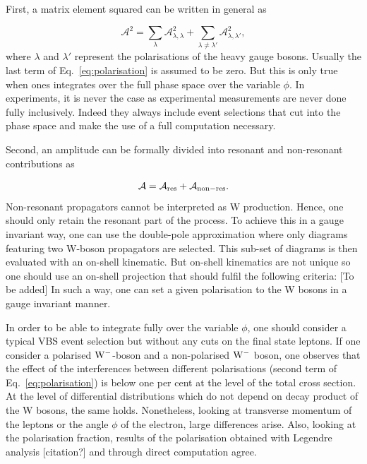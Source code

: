 First, a matrix element squared can be written in general as

\begin{equation}
\label{eq:polarisation}
 \mathcal{A}^2 = \sum_{\lambda} \mathcal{A}^2_{\lambda, \lambda} + \sum_{\lambda \neq \lambda'} \mathcal{A}^2_{\lambda, \lambda'}, 
\end{equation}
%
where $\lambda$ and $\lambda'$ represent the polarisations of the heavy gauge bosons.
Usually the last term of Eq.~\eqref{eq:polarisation} is assumed to be zero.
But this is only true when ones integrates over the full phase space over the variable $\phi$.
In experiments, it is never the case as experimental measurements are never done fully inclusively.
Indeed they always include event selections that cut into the phase space and make the use of a full computation necessary.

Second, an amplitude can be formally divided into resonant and non-resonant contributions as

\begin{equation}
\mathcal{A} = \mathcal{A}_{\rm res} + \mathcal{A}_{\rm non-res} .
\end{equation}
%
Non-resonant propagators cannot be interpreted as W production.
Hence, one should only retain the resonant part of the process.
To achieve this in a gauge invariant way, one can use the double-pole approximation where only diagrams featuring two W-boson propagators are selected.
This sub-set of diagrams is then evaluated with an on-shell kinematic.
But on-shell kinematics are not unique so one should use an on-shell projection that should fulfil the following criteria:
[To be added]
In such a way, one can set a given polarisation to the W bosons in a gauge invariant manner.

In order to be able to integrate fully over the variable $\phi$, one should consider a typical VBS event selection but without any cuts on the final state leptons.
If one consider a polarised ${\rm W^-}$-boson and a non-polarised ${\rm W^-}$ boson, one observes that the effect of the interferences between different polarisations (second term of Eq.~\eqref{eq:polarisation}) is below one per cent at the level of the total cross section.
At the level of differential distributions which do not depend on decay product of the W bosons, the same holds.
Nonetheless, looking at transverse momentum of the leptons or the angle $\phi$ of the electron, large differences arise.
Also, looking at the polarisation fraction, results of the polarisation obtained with Legendre analysis [citation?] and through direct computation agree.

